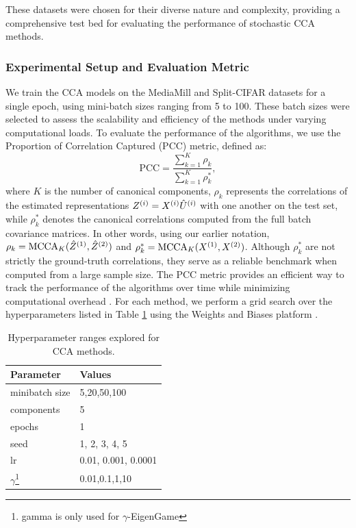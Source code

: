 These datasets were chosen for their diverse nature and complexity, providing a comprehensive test bed for evaluating the performance of stochastic CCA methods.
\subsubsection{Experimental Setup and Evaluation Metric}
We train the CCA models on the MediaMill and Split-CIFAR datasets for a single epoch, using mini-batch sizes ranging from 5 to 100. These batch sizes were selected to assess the scalability and efficiency of the methods under varying computational loads.
To evaluate the performance of the algorithms, we use the Proportion of Correlation Captured (PCC) metric, defined as:
\begin{equation}
\text{PCC} = \frac{\sum_{k=1}^K \rho_k}{\sum_{k=1}^K \rho_k^*},
\end{equation}
where $K$ is the number of canonical components, $\rho_k$ represents the correlations of the estimated representations $Z^{(i)}=X^{(i)}\hat{U}^{(i)}$ with one another on the test set, while $\rho_k^*$ denotes the canonical correlations computed from the full batch covariance matrices.
In other words, using our earlier notation, $\rho_k = \operatorname{MCCA}_K(\hat{Z}^{(1)}, \hat{Z}^{(2)})$ and $\rho_k^* = \operatorname{MCCA}_K(X^{(1)}, X^{(2)})$.
Although $\rho_k^*$ are not strictly the ground-truth correlations, they serve as a reliable benchmark when computed from a large sample size. The PCC metric provides an efficient way to track the performance of the algorithms over time while minimizing computational overhead \citep{meng2021online, gemp2022generalized, ma2015finding, ge2016efficient}.
For each method, we perform a grid search over the hyperparameters listed in Table \ref{tab:hyperparameters} using the Weights and Biases platform \citep{wandb}.
\begin{table}[h!]
    \centering
    \begin{tabular}{|l|l|}
        \hline Parameter             & Values              \\
        \hline minibatch size        & 5,20,50,100         \\
        \hline components            & 5                   \\
        \hline epochs                & 1                   \\
        \hline seed                  & 1, 2, 3, 4, 5       \\
        \hline lr                    & 0.01, 0.001, 0.0001 \\
        \hline $\gamma$\footnote{gamma is only used for $\gamma$-EigenGame} & 0.01,0.1,1,10       \\
        \hline
    \end{tabular}
    \caption{Hyperparameter ranges explored for CCA methods.} 
    \label{tab:hyperparameters}
\end{table}
